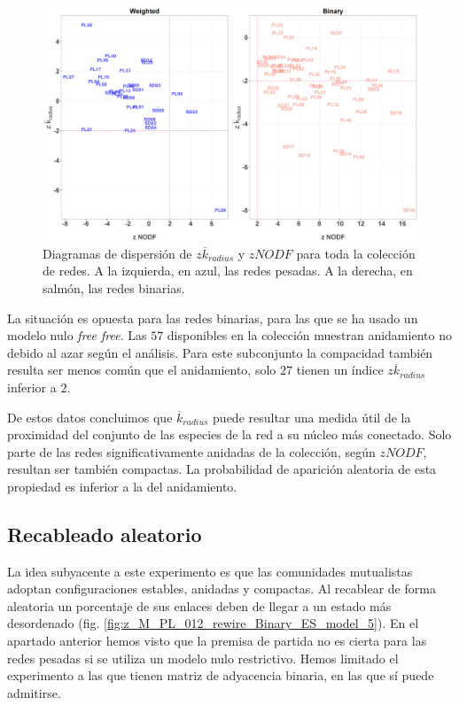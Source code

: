 \begin{figure}[h!]
\centering
\includegraphics[scale=0.35]{Figures/ESTATICA_zscores_all.eps}
\caption {Diagramas de dispersión de $z\overline k_{radius}$ y $zNODF$ para toda la colección de redes. A la izquierda, en azul, las redes pesadas. A la derecha, en salmón, las redes binarias.}
\label{fig:ESTATICA_zscore_all}
\end{figure}

La situación es opuesta para las redes binarias, para las que se ha usado un modelo nulo \textit{free free}. Las $57$ disponibles en la colección muestran anidamiento no debido al azar según el análisis. Para este subconjunto la compacidad también resulta ser menos común que el anidamiento, solo $27$ tienen un índice $z\overline {k}_{radius}$ inferior a $2$.

De estos datos concluimos que $\overline k_{radius}$ puede resultar una medida útil de la proximidad del conjunto de las especies de la red a su núcleo más conectado. Solo parte de las redes significativamente anidadas de la colección, según $zNODF$, resultan ser también compactas. La probabilidad de aparición aleatoria de esta propiedad es inferior a la del anidamiento.


\subsection{Recableado aleatorio}

La idea subyacente a este experimento es que las comunidades mutualistas adoptan configuraciones estables, anidadas y compactas. Al recablear de forma aleatoria un porcentaje de sus enlaces deben de llegar a un estado más desordenado (fig. \ref{fig:z_M_PL_012_rewire_Binary_ES_model_5}). En el apartado anterior hemos visto que la premisa de partida no es cierta para las redes pesadas si se utiliza un modelo nulo restrictivo. Hemos limitado el experimento a las que tienen matriz de adyacencia binaria, en las que sí puede admitirse.


